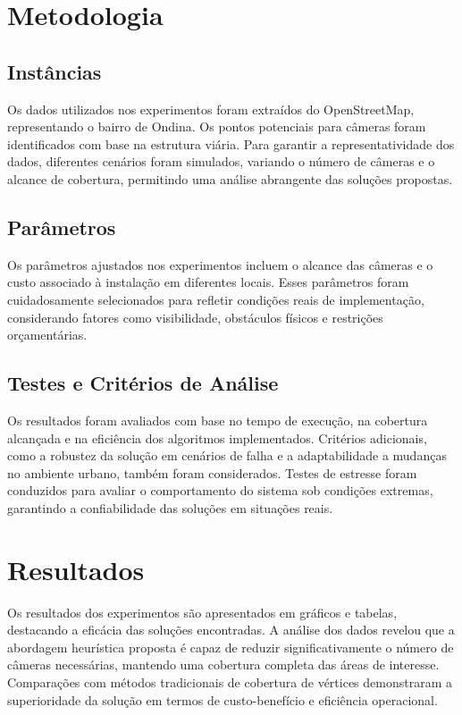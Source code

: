 \documentclass[12pt, a4paper]{report}
\begin{document}
\section{Metodologia}
\subsection{Instâncias}
Os dados utilizados nos experimentos foram extraídos do OpenStreetMap, representando o bairro de Ondina. Os pontos potenciais para câmeras foram identificados com base na estrutura viária. Para garantir a representatividade dos dados, diferentes cenários foram simulados, variando o número de câmeras e o alcance de cobertura, permitindo uma análise abrangente das soluções propostas.

\subsection{Parâmetros}
Os parâmetros ajustados nos experimentos incluem o alcance das câmeras e o custo associado à instalação em diferentes locais. Esses parâmetros foram cuidadosamente selecionados para refletir condições reais de implementação, considerando fatores como visibilidade, obstáculos físicos e restrições orçamentárias.

\subsection{Testes e Critérios de Análise}
Os resultados foram avaliados com base no tempo de execução, na cobertura alcançada e na eficiência dos algoritmos implementados. Critérios adicionais, como a robustez da solução em cenários de falha e a adaptabilidade a mudanças no ambiente urbano, também foram considerados. Testes de estresse foram conduzidos para avaliar o comportamento do sistema sob condições extremas, garantindo a confiabilidade das soluções em situações reais.

\section{Resultados}
Os resultados dos experimentos são apresentados em gráficos e tabelas, destacando a eficácia das soluções encontradas. A análise dos dados revelou que a abordagem heurística proposta é capaz de reduzir significativamente o número de câmeras necessárias, mantendo uma cobertura completa das áreas de interesse. Comparações com métodos tradicionais de cobertura de vértices demonstraram a superioridade da solução em termos de custo-benefício e eficiência operacional.
\end{document}
